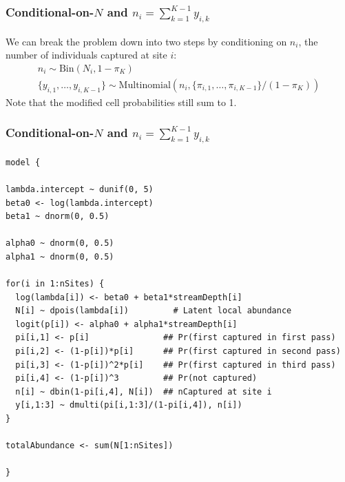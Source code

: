 \documentclass[color=usenames,dvipsnames]{beamer}\usepackage[]{graphicx}\usepackage[]{xcolor}
\makeatletter
\newenvironment{kframe}{%
 \def\at@end@of@kframe{}%
 \ifinner\ifhmode%
  \def\at@end@of@kframe{\end{minipage}}%
  \begin{minipage}{\columnwidth}%
 \fi\fi%
 \def\FrameCommand##1{\hskip\@totalleftmargin \hskip-\fboxsep
 \colorbox{shadecolor}{##1}\hskip-\fboxsep
     \hskip-\linewidth \hskip-\@totalleftmargin \hskip\columnwidth}%
 \MakeFramed {\advance\hsize-\width
   \@totalleftmargin\z@ \linewidth\hsize
   \@setminipage}}%
 {\par\unskip\endMakeFramed%
 \at@end@of@kframe}
\newenvironment{knitrout}{}{} %
\makeatother
\begin{document}
\begin{frame}[fragile]
  \frametitle{\normalsize Conditional-on-$N$ and $n_i=\sum_{k=1}^{K-1} y_{i,k}$}
  We can break the problem down into two steps by conditioning on
  $n_i$, the number of individuals captured at site $i$:
  \small
  \begin{gather*}
    n_i \sim \mathrm{Bin}(N_i, 1-\pi_K) \\
    \{y_{i,1}, \dots, y_{i,K-1}\} \sim \mathrm{Multinomial}(n_i,
    \{\pi_{i,1}, \dots, \pi_{i,K-1}\}/(1-\pi_K))
  \end{gather*}
  \pause
  \vfill
  Note that the modified cell probabilities still sum to 1. 
\end{frame}



\begin{frame}[fragile]
  \frametitle{\normalsize Conditional-on-$N$ and $n_i=\sum_{k=1}^{K-1} y_{i,k}$}
\vspace{-3pt}
\begin{knitrout}\scriptsize
{}\color{fgcolor}\begin{kframe}
\begin{verbatim}
model {

lambda.intercept ~ dunif(0, 5)
beta0 <- log(lambda.intercept)
beta1 ~ dnorm(0, 0.5)

alpha0 ~ dnorm(0, 0.5)  
alpha1 ~ dnorm(0, 0.5)

for(i in 1:nSites) {
  log(lambda[i]) <- beta0 + beta1*streamDepth[i]
  N[i] ~ dpois(lambda[i])         # Latent local abundance
  logit(p[i]) <- alpha0 + alpha1*streamDepth[i]
  pi[i,1] <- p[i]               ## Pr(first captured in first pass)
  pi[i,2] <- (1-p[i])*p[i]      ## Pr(first captured in second pass)
  pi[i,3] <- (1-p[i])^2*p[i]    ## Pr(first captured in third pass)
  pi[i,4] <- (1-p[i])^3         ## Pr(not captured)
  n[i] ~ dbin(1-pi[i,4], N[i])  ## nCaptured at site i
  y[i,1:3] ~ dmulti(pi[i,1:3]/(1-pi[i,4]), n[i])
}

totalAbundance <- sum(N[1:nSites])

}
\end{verbatim}
\end{kframe}
\end{knitrout}
\end{frame}
\end{document}

